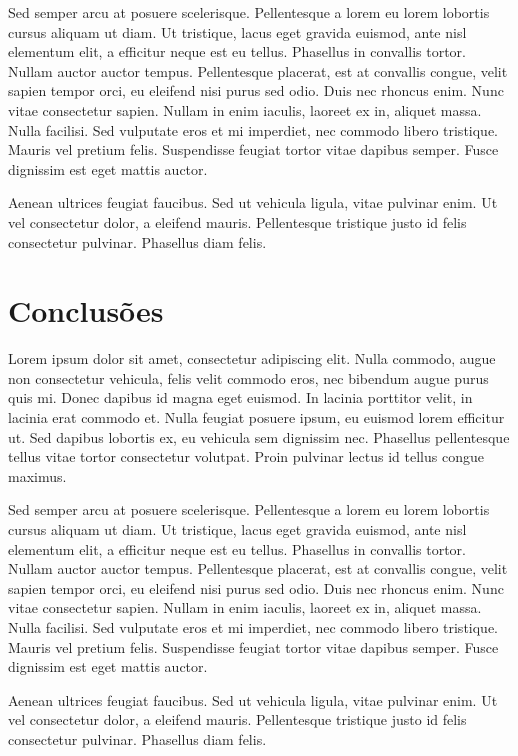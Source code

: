\documentclass[brazil,hardcopy,openany,a4paper]{_ufscthesis}
\begin{document}
Sed semper arcu at posuere scelerisque. Pellentesque a lorem eu lorem lobortis cursus aliquam ut diam. Ut tristique, lacus eget gravida euismod, ante nisl elementum elit, a efficitur neque est eu tellus. Phasellus in convallis tortor. Nullam auctor auctor tempus. Pellentesque placerat, est at convallis congue, velit sapien tempor orci, eu eleifend nisi purus sed odio. Duis nec rhoncus enim. Nunc vitae consectetur sapien. Nullam in enim iaculis, laoreet ex in, aliquet massa. Nulla facilisi. Sed vulputate eros et mi imperdiet, nec commodo libero tristique. Mauris vel pretium felis. Suspendisse feugiat tortor vitae dapibus semper. Fusce dignissim est eget mattis auctor.

Aenean ultrices feugiat faucibus. Sed ut vehicula ligula, vitae pulvinar enim. Ut vel consectetur dolor, a eleifend mauris. Pellentesque tristique justo id felis consectetur pulvinar. Phasellus diam felis.

\chapter{Conclusões}
\label{chapter:conclusoes}
	
Lorem ipsum dolor sit amet, consectetur adipiscing elit. Nulla commodo, augue non consectetur vehicula, felis velit commodo eros, nec bibendum augue purus quis mi. Donec dapibus id magna eget euismod. In lacinia porttitor velit, in lacinia erat commodo et. Nulla feugiat posuere ipsum, eu euismod lorem efficitur ut. Sed dapibus lobortis ex, eu vehicula sem dignissim nec. Phasellus pellentesque tellus vitae tortor consectetur volutpat. Proin pulvinar lectus id tellus congue maximus.

Sed semper arcu at posuere scelerisque. Pellentesque a lorem eu lorem lobortis cursus aliquam ut diam. Ut tristique, lacus eget gravida euismod, ante nisl elementum elit, a efficitur neque est eu tellus. Phasellus in convallis tortor. Nullam auctor auctor tempus. Pellentesque placerat, est at convallis congue, velit sapien tempor orci, eu eleifend nisi purus sed odio. Duis nec rhoncus enim. Nunc vitae consectetur sapien. Nullam in enim iaculis, laoreet ex in, aliquet massa. Nulla facilisi. Sed vulputate eros et mi imperdiet, nec commodo libero tristique. Mauris vel pretium felis. Suspendisse feugiat tortor vitae dapibus semper. Fusce dignissim est eget mattis auctor.

Aenean ultrices feugiat faucibus. Sed ut vehicula ligula, vitae pulvinar enim. Ut vel consectetur dolor, a eleifend mauris. Pellentesque tristique justo id felis consectetur pulvinar. Phasellus diam felis.
\end{document}
